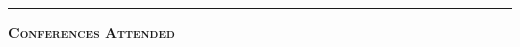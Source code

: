 \documentclass[12pt]{article}
\newcommand{\sectionheading}[1]
{
\bigskip %
\noindent
\hspace{-6.5mm}\textcolor{Gray}{\rule[.75mm]{21.5mm}{1mm}} %
\hspace{.2mm}	%
{\large{\textbf{\textsc{#1}}}} %
}
\newenvironment{date_section}
	{
	\vspace{-1ex}
	\leftmargini = 15ex
		\begin{itemize}[
			labelsep = *,
			labelwidth = 9ex,
			labelindent = 0ex,
			itemindent = !,
			font=\normalfont,
			align=parleft
		]{}
		\itemsep=-1.5mm
	}
	{\end{itemize}\vspace{-2ex}}
\newcommand{\yearmo}[2]{
	\item[
		{\makebox[1ex][r]{#1}}
		\hspace{1ex}
		{\makebox[1ex][l]{#2} }
		] }
\begin{document}
%
%
%
%
%
%
%
%
%


	\sectionheading{Conferences Attended} %
\end{document}
